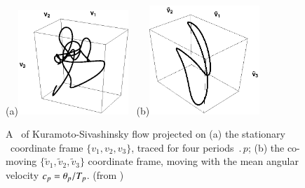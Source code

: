%
\begin{figure}[ht]
(a)\includegraphics[width=0.37\textwidth, clip=true]
                    {../figs/ks22rpo033.50_04.045E2.eps}
~(b)\includegraphics[width=0.37\textwidth, clip=true]
                     {../figs/ks22rpo033.50_04.045E2CM.eps}
\caption{
 A \rpo\ of Kuramoto-Sivashinsky flow projected on
 (a) the stationary \statesp\ coordinate frame
 $\{v_1,v_2,v_3\}$, traced for four periods
 $\period{p}$;
 (b) the co-moving $\{\tilde{v}_1,\tilde{v}_2,\tilde{v}_3\}$
 coordinate frame, moving with the mean angular velocity
 $c_p={\bf \theta}_p/{T_{p}}$.
\hfill (from )
}
\label{f:MeanVelocityFrame}
\end{figure}
